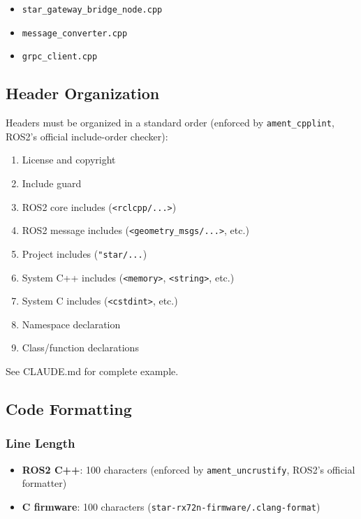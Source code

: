 \begin{itemize}
\item \texttt{star\_gateway\_bridge\_node.cpp}
\item \texttt{message\_converter.cpp}
\item \texttt{grpc\_client.cpp}
\end{itemize}

\subsection{Header Organization}

Headers must be organized in a standard order (enforced by
\texttt{ament\_cpplint}, ROS2's official include-order checker):

\begin{enumerate}
\item License and copyright
\item Include guard
\item ROS2 core includes (\texttt{<rclcpp/...>})
\item ROS2 message includes (\texttt{<geometry\_msgs/...>}, etc.)
\item Project includes (\texttt{"star/...})
\item System C++ includes (\texttt{<memory>}, \texttt{<string>}, etc.)
\item System C includes (\texttt{<cstdint>}, etc.)
\item Namespace declaration
\item Class/function declarations
\end{enumerate}

See CLAUDE.md for complete example.

\subsection{Code Formatting}

\subsubsection{Line Length}

\begin{itemize}
\item \textbf{ROS2 C++}: 100 characters (enforced by
\texttt{ament\_uncrustify}, ROS2's official formatter)
\item \textbf{C firmware}: 100 characters
(\texttt{star-rx72n-firmware/.clang-format}) \end{itemize}

